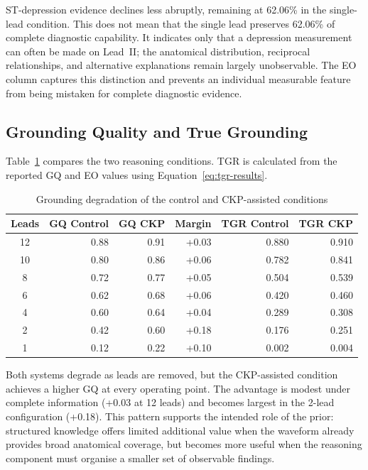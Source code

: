 \documentclass{ssnreview}
\begin{document}
ST-depression evidence declines less abruptly, remaining at 62.06\% in the single-lead
condition. This does not mean that the single lead preserves 62.06\% of complete
diagnostic capability. It indicates only that a depression measurement can often be made
on Lead~II; the anatomical distribution, reciprocal relationships, and alternative
explanations remain largely unobservable. The EO column captures this distinction and
prevents an individual measurable feature from being mistaken for complete diagnostic
evidence.

\subsection{Grounding Quality and True Grounding}

Table~\ref{tab:grounding-results} compares the two reasoning conditions. TGR is calculated
from the reported GQ and EO values using Equation~\ref{eq:tgr-results}.

\begin{table}[H]
  \centering
  \small
  \caption{Grounding degradation of the control and CKP-assisted conditions}
  \label{tab:grounding-results}
  \begin{tabular}{@{}crrrrr@{}}
    \toprule
    \textbf{Leads} &
    \textbf{GQ Control} &
    \textbf{GQ CKP} &
    \textbf{Margin} &
    \textbf{TGR Control} &
    \textbf{TGR CKP} \\
    \midrule
    12 & 0.88 & 0.91 & +0.03 & 0.880 & 0.910 \\
    10 & 0.80 & 0.86 & +0.06 & 0.782 & 0.841 \\
    8  & 0.72 & 0.77 & +0.05 & 0.504 & 0.539 \\
    6  & 0.62 & 0.68 & +0.06 & 0.420 & 0.460 \\
    4  & 0.60 & 0.64 & +0.04 & 0.289 & 0.308 \\
    2  & 0.42 & 0.60 & +0.18 & 0.176 & 0.251 \\
    1  & 0.12 & 0.22 & +0.10 & 0.002 & 0.004 \\
    \bottomrule
  \end{tabular}
\end{table}

Both systems degrade as leads are removed, but the CKP-assisted condition achieves a
higher GQ at every operating point. The advantage is modest under complete information
(+0.03 at 12 leads) and becomes largest in the 2-lead configuration (+0.18). This pattern
supports the intended role of the prior: structured knowledge offers limited additional
value when the waveform already provides broad anatomical coverage, but becomes more
useful when the reasoning component must organise a smaller set of observable findings.
\end{document}
